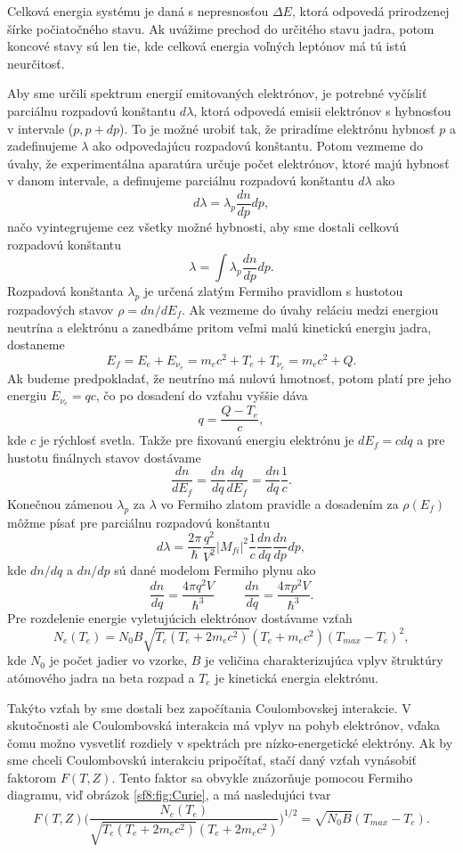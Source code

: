 \documentclass[../../main.tex]{subfiles}
\begin{document}
Celková energia systému je daná s nepresnosťou $\Delta E$, ktorá odpovedá prirodzenej šírke počiatočného stavu. Ak uvážime prechod do určitého stavu jadra, potom koncové stavy sú len tie, kde celková energia voľných leptónov má tú istú neurčitosť.

Aby sme určili spektrum energií emitovaných elektrónov, je potrebné vyčísliť parciálnu rozpadovú konštantu $d\lambda$, ktorá odpovedá emisii elektrónov s hybnosťou v intervale ($p,p+dp$). To je možné urobiť tak, že priradíme elektrónu hybnosť $p$ a zadefinujeme $\lambda$ ako odpovedajúcu rozpadovú konštantu. Potom vezmeme do úvahy, že experimentálna aparatúra určuje počet elektrónov, ktoré majú hybnosť v danom intervale, a definujeme parciálnu rozpadovú konštantu $d\lambda$ ako
$$ d\lambda = \lambda_p \frac{dn}{dp}dp, $$
načo vyintegrujeme cez všetky možné hybnosti, aby sme dostali celkovú rozpadovú konštantu
$$ \lambda = \int \lambda_p \frac{dn}{dp}dp. $$
Rozpadová konštanta $\lambda_p$ je určená zlatým Fermiho pravidlom s hustotou rozpadových stavov $\rho = dn/dE_{f}$. Ak vezmeme do úvahy reláciu medzi energiou neutrína a elektrónu a zanedbáme pritom veľmi malú kinetickú energiu jadra, dostaneme
$$ E_f = E_e + E_{\nu_e} = m_ec^2 + T_e +T_{\nu_e} = m_ec^2+Q.$$
Ak budeme predpokladať, že neutríno má nulovú hmotnosť, potom platí pre jeho energiu $E_{\nu_e} = qc$, čo po dosadení do vzťahu vyššie dáva 
$$ q = \frac{Q-T_e}{c}, $$
kde $c$ je rýchlosť svetla. Takže pre fixovanú energiu elektrónu je $dE_f=cdq$ a pre hustotu finálnych stavov dostávame
$$ \frac{dn}{dE_f} = \frac{dn}{dq}\frac{dq}{dE_f} = \frac{dn}{dq}\frac{1}{c}.$$
Konečnou zámenou $\lambda_p$ za $\lambda$ vo Fermiho zlatom pravidle a dosadením za $\rho(E_f)$ môžme písať pre parciálnu rozpadovú konštantu
$$ d\lambda = \frac{2\pi}{\hbar} \frac{q^2}{V^2}\vert M_{fi} \vert^2 \frac{1}{c} \frac{dn}{dq} \frac{dn}{dp}dp, $$
kde $dn/dq$ a $dn/dp$ sú dané modelom Fermiho plynu ako 
$$ \frac{dn}{dq} = \frac{4\pi q^2 V}{\hbar^3} \hspace{1cm} \frac{dn}{dq} = \frac{4\pi p^2 V}{\hbar^3}.$$
Pre rozdelenie energie vyletujúcich elektrónov dostávame vzťah
$$ N_e(T_e) = N_0B\sqrt{T_e(T_e+2m_ec^2)}(T_e+m_ec^2)(T_{max}-T_e)^2, $$
kde $N_0$ je počet jadier vo vzorke, $B$ je veličina charakterizujúca vplyv štruktúry atómového jadra na beta rozpad a $T_e$ je kinetická energia elektrónu. 

Takýto vzťah by sme dostali bez započítania Coulombovskej interakcie. V skutočnosti ale Coulombovská interakcia má vplyv na pohyb elektrónov, vďaka čomu možno vysvetliť rozdiely v spektrách pre nízko-energetické elektróny. Ak by sme chceli Coulombovskú interakciu pripočítať, stačí daný vzťah vynásobiť faktorom $F(T,Z)$. Tento faktor sa obvykle znázorňuje pomocou Fermiho diagramu, viď obrázok \ref{sf8:fig:Curie}, a má nasledujúci tvar
$$ F(T,Z) \bigg( \frac{N_e(T_e)}{\sqrt{T_e(T_e+2m_ec^2)}(T_e+2m_ec^2)}  \bigg)^{1/2} = \sqrt{N_0B}(T_{max}-T_e).$$ 
\end{document}
